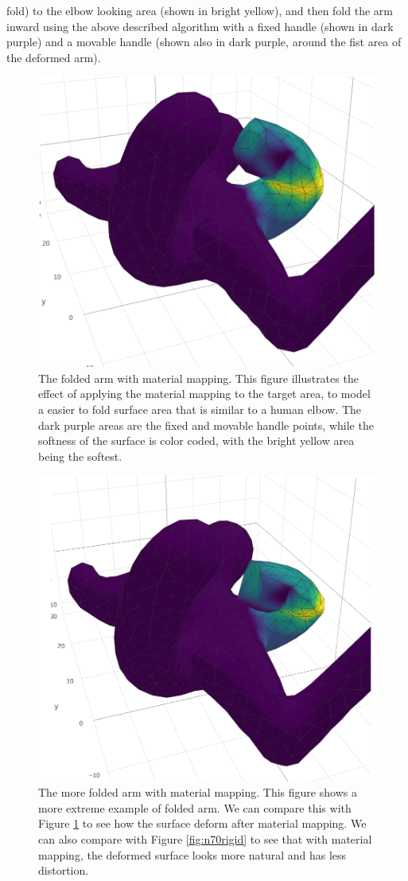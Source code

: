 \documentclass{6838publ}
\begin{document}
fold) to the elbow looking area (shown in bright yellow), and then
fold the arm inward using the above described algorithm with a fixed
handle (shown in dark purple) and a movable handle (shown also in dark
purple, around the fist area of the deformed arm).
\begin{figure}[t!]  \centering
  \includegraphics[width=.6\linewidth]{n50soft}
  \caption{The folded arm with material mapping.  This figure
illustrates the effect of applying the material mapping to the target
area, to model a easier to fold surface area that is similar to a
human elbow. The dark purple areas are the fixed and movable handle
points, while the softness of the surface is color coded, with the
bright yellow area being the softest. }
  \label{fig:n50soft}
\end{figure}
\begin{figure}[t!]  \centering
  \includegraphics[width=.6\linewidth]{n70soft}
  \caption{The more folded arm with material mapping.  This figure
shows a more extreme example of folded arm. We can compare this with
Figure \ref{fig:n50soft} to see how the surface deform after material
mapping. We can also compare with Figure \ref{fig:n70rigid} to see
that with material mapping, the deformed surface looks more natural
and has less distortion.}
  \label{fig:n70soft}
\end{figure}
\end{document}
